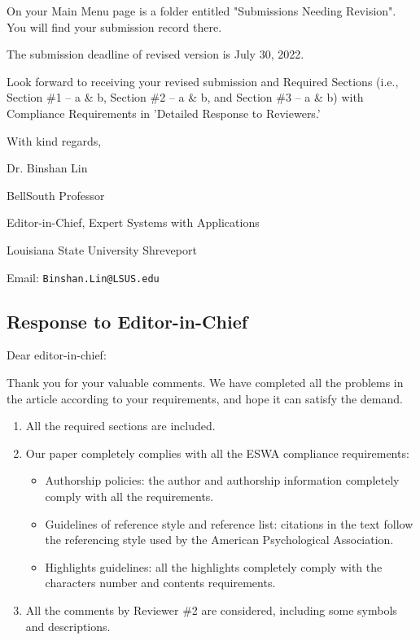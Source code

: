 \documentclass[12pt, review, authoryear]{elsarticle}
\begin{document}
On your Main Menu page is a folder entitled "Submissions Needing Revision". You will find your submission record there.

The submission deadline of revised version is July 30, 2022.

Look forward to receiving your revised submission and Required Sections (i.e., Section \#1 – a \& b, Section \#2 – a \& b, and Section \#3 – a \& b) with Compliance Requirements in 'Detailed Response to Reviewers.'

\noindent With kind regards,

\noindent Dr. Binshan Lin 

\noindent BellSouth Professor 

\noindent Editor-in-Chief, Expert Systems with Applications  

\noindent Louisiana State University Shreveport 

\noindent Email: \verb|Binshan.Lin@LSUS.edu| 


\subsection{Response to Editor-in-Chief}
\noindent Dear editor-in-chief: 

Thank you for your valuable comments. We have completed all the
problems in the article according to your requirements, and hope it can satisfy the demand.

\begin{enumerate}
  \item All the required sections are included.
  \item Our paper completely complies with all the ESWA compliance requirements:
  \begin{itemize}
    \item Authorship policies: the author and authorship information completely comply with all the requirements.
    \item Guidelines of reference style and reference list: citations in the text follow the referencing style used by the American Psychological Association.
    \item Highlights guidelines: all the highlights completely comply with the characters  number and contents requirements.
  \end{itemize}
  \item All the comments by Reviewer \#2 are considered, including some symbols and descriptions.
\end{enumerate}
\end{document}
